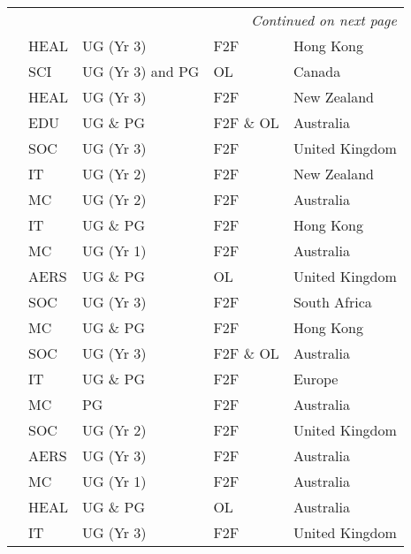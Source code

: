 \begin{center}
\begin{longtable}{|l|l|l|l|l|}
\hline
\endhead
\hline \multicolumn{5}{r}{\textit{Continued on next page}} \\
\endfoot
\hline
\endlastfoot
\citet{Tang:1999}	&	HEAL	&	UG (Yr 3)	&	F2F	&	Hong Kong	\\
\citet{hoddinott2000biggs}	&	SCI	&	UG (Yr 3) and PG	&	OL	&	Canada	\\
\citet{Davey:2002}	&	HEAL	&	UG (Yr 3)	&	F2F	&	New Zealand	\\
\citet{talay2003online}	&	EDU	&	UG \& PG	&	F2F \& OL	&	Australia	\\
\citet{Lin:2004}	&	SOC	&	UG (Yr 3)	&	F2F	&	United Kingdom	\\
\citet{warren2005teaching}	&	IT	&	UG (Yr 2)	&	F2F	&	New Zealand	\\
\citet{shepherd2005weaving}	&	MC	&	UG (Yr 2)	&	F2F	&	Australia	\\
\citet{yip2005web}	&	IT	&	UG \& PG	&	F2F	&	Hong Kong	\\
\citet{hendersonenriching}	&	MC	&	UG (Yr 1)	&	F2F	&	Australia	\\
\citet{brown2006looking}	&	AERS	&	UG \& PG	&	OL	&	United Kingdom	\\
\citet{Israel:2007}	&	SOC	&	UG (Yr 3)	&	F2F	&	South Africa	\\
\citet{Vogel:2007}	&	MC	&	UG \& PG	&	F2F	&	Hong Kong	\\
\citet{jones2007wiki}	&	SOC	&	UG (Yr 3)	&	F2F \& OL	&	Australia	\\
\citet{Brabrand:2008}	&	IT	&	UG \& PG	&	F2F	&	Europe	\\
\citet{Treleaven:2008}	&	MC	&	PG	&	F2F	&	Australia	\\
\citet{Morton:2008}	&	SOC	&	UG (Yr 2)	&	F2F	&	United Kingdom	\\
\citet{Raman:2008}	&	AERS	&	UG (Yr 3)	&	F2F	&	Australia	\\
\citet{Kuhn:2009}	&	MC	&	UG (Yr 1)	&	F2F	&	Australia	\\
\citet{raeburn2009blended}	&	HEAL	&	UG \& PG	&	OL	&	Australia	\\
\citet{Hill:2009}	&	IT	&	UG (Yr 3)	&	F2F	&	United Kingdom	\\

\end{longtable}
\end{center}
